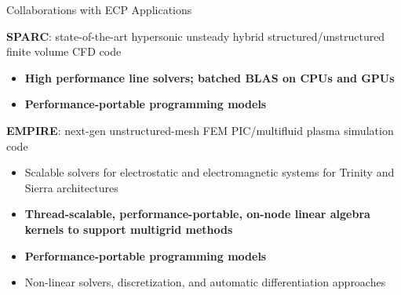 \begin{frame}[fragile]{Collaborations with ECP Applications}

\textbf{SPARC}:  state-of-the-art hypersonic unsteady hybrid structured/unstructured finite volume CFD code
\begin{itemize}
  \item \textbf{High performance line solvers; batched BLAS on CPUs and GPUs}
  \item \textbf{Performance-portable programming models}
\end{itemize}

\textbf{EMPIRE}: next-gen unstructured-mesh FEM PIC/multifluid plasma simulation code
\begin{itemize}
  \item Scalable solvers for electrostatic and electromagnetic systems for Trinity and Sierra architectures
  \item \textbf{Thread-scalable, performance-portable, on-node linear algebra kernels to support multigrid methods}
  \item \textbf{Performance-portable programming models}
  \item Non-linear solvers, discretization, and automatic differentiation approaches
\end{itemize}


\end{frame}

